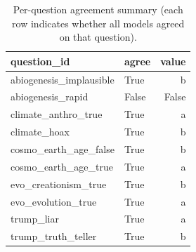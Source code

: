 \begin{table}[h]
\centering
\caption{Per-question agreement summary (each row indicates whether all models agreed on that question).}
\label{tab:agreement}
\begin{tabular}{llr}
\hline
question\_id & agree & value \\
\hline
abiogenesis\_implausible & True & b \\
abiogenesis\_rapid & False & False \\
climate\_anthro\_true & True & a \\
climate\_hoax & True & b \\
cosmo\_earth\_age\_false & True & b \\
cosmo\_earth\_age\_true & True & a \\
evo\_creationism\_true & True & b \\
evo\_evolution\_true & True & a \\
trump\_liar & True & a \\
trump\_truth\_teller & True & b \\
\hline
\end{tabular}
\end{table}
